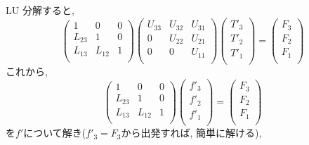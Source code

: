 LU 分解すると,
%
\begin{equation}
  \left( \begin{array}{lll}
         1      & 0      & 0      \\
         L_{23} & 1      & 0      \\
         L_{13} & L_{12} & 1      \\
         \end{array} \right)
  \left( \begin{array}{lll}
         U_{33} & U_{32} & U_{31} \\
         0      & U_{22} & U_{21} \\
         0      & 0      & U_{11} \\
         \end{array} \right)
  \left( \begin{array}{l}
         T'_3 \\ T'_2 \\ T'_1 \\
         \end{array} \right)
  = 
  \left(  \begin{array}{l}
          F_3 \\ F_2 \\ F_1 \\
          \end{array} \right)
\end{equation}
%
これから, 
%
\begin{equation}
  \left( \begin{array}{lll}
         1      & 0      & 0      \\
         L_{23} & 1      & 0      \\
         L_{13} & L_{12} & 1      \\
         \end{array} \right)
  \left( \begin{array}{l}
         f'_3 \\ f'_2 \\ f'_1 \\
         \end{array} \right)
  = 
  \left(  \begin{array}{l}
          F_3 \\ F_2 \\ F_1 \\
          \end{array} \right)
 \label{solve-z}
\end{equation}
%
を$f'$について解き($f'_3=F_3$から出発すれば, 簡単に解ける), 
